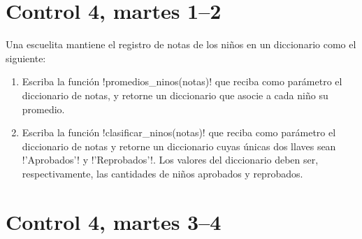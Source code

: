 \documentclass[12pt,spanish,a5paper,landscape]{article}
\begin{document}
  \part*{Control 4, martes 1--2}
  \newpage

  Una escuelita mantiene el registro de notas de los niños
  en un diccionario como el siguiente:
  

  \begin{enumerate}

    \item
      Escriba la función \li!promedios_ninos(notas)!
      que reciba como parámetro el diccionario de notas,
      y retorne un diccionario que asocie a cada niño su promedio.
      

    \item
      Escriba la función \li!clasificar_ninos(notas)!
      que reciba como parámetro el diccionario de notas
      y retorne un diccionario cuyas únicas dos llaves sean
      \li!'Aprobados'! y \li!'Reprobados'!.
      Los valores del diccionario deben ser, respectivamente,
      las cantidades de niños aprobados y reprobados.
      

  \end{enumerate}

  \newpage

  \part*{Control 4, martes 3--4}
  \newpage
\end{document}
